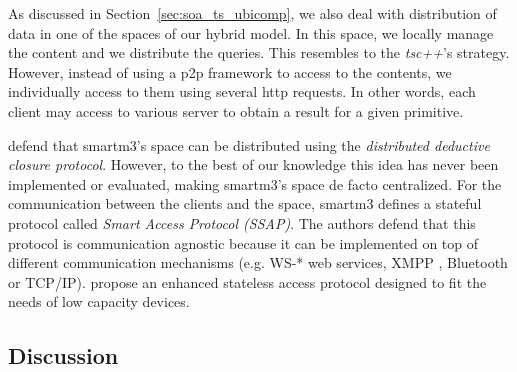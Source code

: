 As discussed in Section~\ref{sec:soa_ts_ubicomp}, we also deal with distribution of data in one of the spaces of our hybrid model.
In this space, we locally manage the content and we distribute the queries.
This resembles to the \emph{tsc++}'s strategy.
However, instead of using a \ac{p2p} framework to access to the contents,
we individually access to them using several \ac{http} requests. %
In other words, each client may access to various server to obtain a result for a given primitive.

\citet{honkola_smart-m3_2010} defend that \acs{smartm3}'s space can be distributed using the \emph{distributed deductive closure protocol}.
However, to the best of our knowledge this idea has never been implemented or evaluated, making \acs{smartm3}'s space de facto centralized.
For the communication between the clients and the space, \acs{smartm3} defines a stateful protocol called \emph{Smart Access Protocol (SSAP)}. %
The authors defend that this protocol is communication agnostic because it can be implemented on top of different communication mechanisms
(e.g. WS-* web services, XMPP , Bluetooth  or TCP/IP).
\citet{kiljander_knowledge_2012} propose an enhanced stateless access protocol designed to fit the needs of low capacity devices.





\subsection{Discussion}
\label{sec:soa_tsc_discussion}

